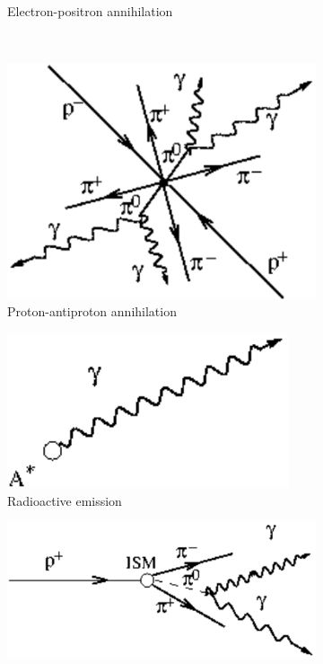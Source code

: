 \documentclass[main.tex]{subfiles}
\begin{document}
\begin{figure}
\begin{subfigure}{0.31\textwidth}
\caption{Electron-positron annihilation} \label{fig:1f} 
\end{subfigure}
\\
\begin{subfigure}{0.31\textwidth}
\includegraphics[width=\linewidth]{Pictures/protonantiproton.pdf}
\caption{Proton-antiproton annihilation} \label{fig:1g}
\end{subfigure}
\hspace*{\fill} %
\begin{subfigure}{0.31\textwidth}
\includegraphics[width=\linewidth]{Pictures/radioactiveemission.pdf}
\caption{Radioactive emission} \label{fig:1h}
\end{subfigure}
\hspace*{\fill} %
\begin{subfigure}{0.31\textwidth}
\includegraphics[width=\linewidth]{Pictures/hadrocollision.pdf}

\end{subfigure}
\end{figure}
\end{document}
